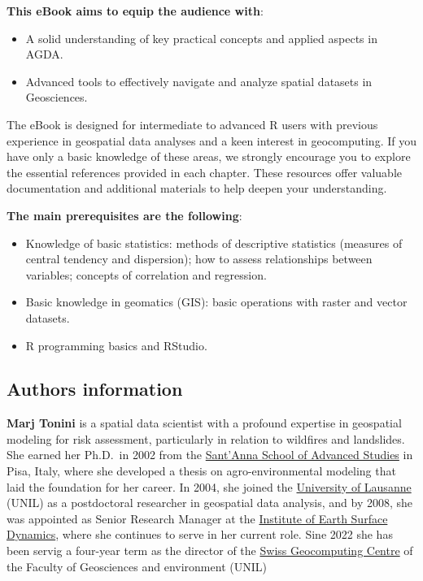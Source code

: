 \documentclass[
]{article}
\providecommand{\tightlist}{%
  \setlength{\itemsep}{0pt}\setlength{\parskip}{0pt}}
\begin{document}
\textbf{This eBook aims to equip the audience with}:

\begin{itemize}
\tightlist
\item
  A solid understanding of key practical concepts and applied aspects in AGDA.
\item
  Advanced tools to effectively navigate and analyze spatial datasets in Geosciences.
\end{itemize}

The eBook is designed for intermediate to advanced R users with previous experience in geospatial data analyses and a keen interest in geocomputing.
If you have only a basic knowledge of these areas, we strongly encourage you to explore the essential references provided in each chapter.
These resources offer valuable documentation and additional materials to help deepen your understanding.

\textbf{The main prerequisites are the following}:

\begin{itemize}
\tightlist
\item
  Knowledge of basic statistics: methods of descriptive statistics (measures of central tendency and dispersion); how to assess relationships between variables; concepts of correlation and regression.
\item
  Basic knowledge in geomatics (GIS): basic operations with raster and vector datasets.
\item
  R programming basics and RStudio.
\end{itemize}

\subsection*{Authors information}\label{authors-information}

\textbf{Marj Tonini} is a spatial data scientist with a profound expertise in geospatial modeling for risk assessment, particularly in relation to wildfires and landslides.
She earned her Ph.D.~in 2002 from the \href{https://www.santannapisa.it/en}{Sant'Anna School of Advanced Studies} in Pisa, Italy, where she developed a thesis on agro-environmental modeling that laid the foundation for her career.
In 2004, she joined the \href{https://www.unil.ch/central/en/home.html}{University of Lausanne} (UNIL) as a postdoctoral researcher in geospatial data analysis, and by 2008, she was appointed as Senior Research Manager at the \href{https://www.unil.ch/idyst/en/home.html}{Institute of Earth Surface Dynamics}, where she continues to serve in her current role.
Sine 2022 she has been servig a four-year term as the director of the \href{https://unil-sgc.github.io/}{Swiss Geocomputing Centre} of the Faculty of Geosciences and environment (UNIL)
\end{document}
